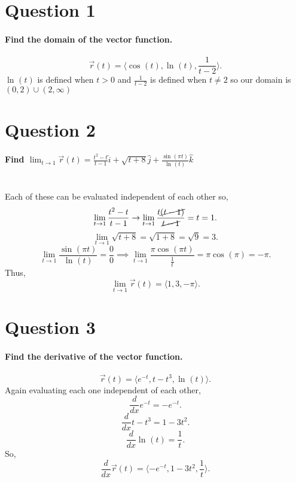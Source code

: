 \section{Question 1}%
\label{sec: Question 1 }
\paragraph{Find the domain of the vector function.}
\[
\vec{ r }\left( t \right) = \langle \cos^{  } \left( t \right) , \ln^{  } \left( t \right) , \frac{ 1 }{ t-2 } \rangle
.\] 
$ \ln^{  } \left( t \right)  $ is defined when $ t>0 $ and $ \frac{ 1 }{ t-2 }  $ is defined when $ t \neq 2 $ so our domain is $ \left( 0,2 \right) \cup \left( 2,\infty \right) $
\section{Question 2}%
\label{sec: Question 2 }
\paragraph{Find $ \lim_{ t \to 1} \vec{ r }\left( t \right) =\frac{ t^2-t }{ t-1 }\hat{ i } + \sqrt{ t+8 } \hat{ j } + \frac{ \sin^{  } \left( \pi t \right)  }{ \ln^{  } \left( t \right)  }\hat{ k } $ \\ \\}

Each of these can be evaluated independent of each other so,
\[
\lim_{ t \to 1} \frac{ t^2-t }{ t-1 } \to \lim_{ t \to 1} \frac{ t\cancel{ \left( t-1 \right) }  }{ \cancel{ t-1 } } = t = 1
.\] 
\[
\lim_{ t \to 1} \sqrt{ t+8 } = \sqrt{ 1+8 } = \sqrt{ 9 } = 3
.\] 
\[
\lim_{ t \to 1} \frac{ \sin^{  } \left( \pi t \right)  }{ \ln^{  } \left( t \right)  } = \frac{ 0 }{ 0 } \implies \lim_{ t \to 1} \frac{ \pi \cos^{  } \left( \pi t\right)  }{ \frac{ 1 }{ t }  } = \pi \cos^{  } \left( \pi \right) = -\pi
.\] 
Thus,
\[
\lim_{ t \to 1} \vec{ r }\left( t \right) = \langle 1, 3, -\pi \rangle
.\] 
\section{Question 3}%
\label{sec: Question 3 }
\paragraph{Find the derivative of the vector function.}
\[
\vec{ r }\left( t \right)  = \langle e^{ -t }, t-t^3, \ln^{  } \left( t \right) \rangle
.\] 
Again evaluating each one independent of each other,
\[
\frac{ d }{ dx } e^{ -t } = -e^{ -t }
.\] 
\[
\frac{ d }{ dx } t-t^3 = 1-3t^2
.\] 
\[
\frac{ d }{ dx } \ln^{  } \left( t \right) = \frac{ 1 }{ t } 
.\] 
So,
\[
\frac{ d }{ dx } \vec{ r }\left( t \right) = \langle -e^{ -t }, 1-3t^2, \frac{ 1 }{ t } \rangle
.\] 
